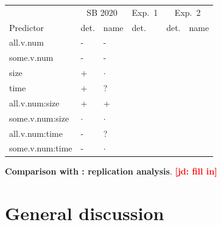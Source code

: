\documentclass[10pt,letterpaper]{article}
\newcommand{\expref}[1]{Exp.~#1}
\newcommand{\jd}[1]{\textcolor{Red}{\textbf{[jd: #1]}}}
\begin{document}
\begin{table}
{\small
\begin{tabular}{l l l l l l }
\toprule
& \multicolumn{2}{c}{SB 2020} & \expref{1} & \multicolumn{2}{c}{\expref{2}}\\
Predictor & det. & name & det. & det. & name \\
\midrule
all.v.num & - &  - & \\
some.v.num & - &  - & \\
size & + &  $\cdot$ & \\
time & + &  ? & \\
all.v.num:size & + &  + &  \\
some.v.num:size & $\cdot$ &  $\cdot$ & \\
all.v.num:time & - &  ? & \\
some.v.num:time & - &  $\cdot$ & \\
\bottomrule
\end{tabular}
}
\end{table}

\textbf{Comparison with : replication analysis}. \jd{fill in}

\section{General discussion}
\end{document}

